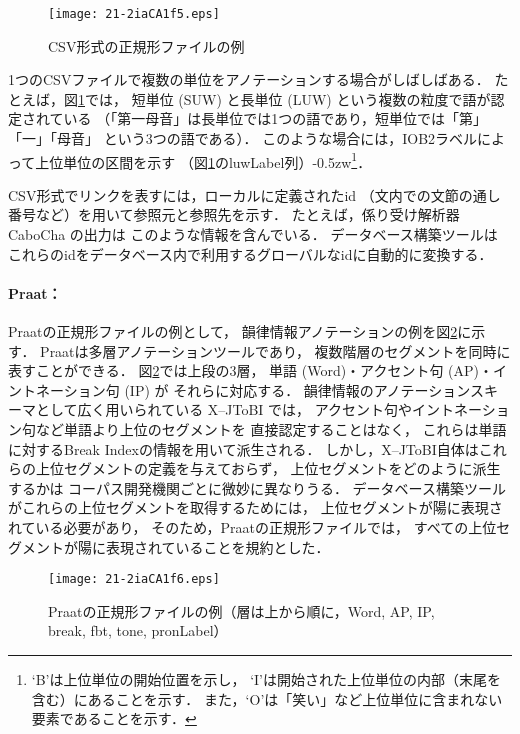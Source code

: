 \documentclass[japanese]{jnlp_1.4}
\begin{document}
\begin{figure}[t]
\begin{center}
\texttt{[image: 21-2iaCA1f5.eps]}
\end{center}
\caption{CSV形式の正規形ファイルの例}
\label{fig:CSV}
\end{figure}

1つのCSVファイルで複数の単位をアノテーションする場合がしばしばある．
たとえば，図\ref{fig:CSV}では，
短単位 (SUW) と長単位 (LUW) という複数の粒度で語が認定されている
（「第一母音」は長単位では1つの語であり，短単位では「第」「一」「母音」
という3つの語である）．
このような場合には，IOB2ラベル\cite{TjongKimSang_1999_RTC}によって上位単位の区間を示す
（図\ref{fig:CSV}のluwLabel列）{\kern-0.5zw}\footnote{
 `B'は上位単位の開始位置を示し，
`I'は開始された上位単位の内部（末尾を含む）にあることを示す．
また，`O'は「笑い」など上位単位に含まれない要素であることを示す．
}．

CSV形式でリンクを表すには，ローカルに定義されたid
（文内での文節の通し番号など）を用いて参照元と参照先を示す．
たとえば，係り受け解析器CaboCha \cite{Kudo_2002_JDA}の出力は
このような情報を含んでいる．
データベース構築ツールは
これらのidをデータベース内で利用するグローバルなidに自動的に変換する．

\paragraph{Praat：}

Praatの正規形ファイルの例として，
韻律情報アノテーションの例を図\ref{fig:Praat}に示す．
Praatは多層アノテーションツールであり，
複数階層のセグメントを同時に表すことができる．
図\ref{fig:Praat}では上段の3層，
単語 (Word)・アクセント句 (AP)・イントネーション句 (IP) が
それらに対応する．
韻律情報のアノテーションスキーマとして広く用いられている
    X--JToBI \cite{五十嵐_2006_韻律情}では，
アクセント句やイントネーション句など単語より上位のセグメントを
直接認定することはなく，
これらは単語に対するBreak Indexの情報を用いて派生される．
しかし，X--JToBI自体はこれらの上位セグメントの定義を与えておらず，
上位セグメントをどのように派生するかは
コーパス開発機関ごとに微妙に異なりうる．
データベース構築ツールがこれらの上位セグメントを取得するためには，
上位セグメントが陽に表現されている必要があり，
そのため，Praatの正規形ファイルでは，
すべての上位セグメントが陽に表現されていることを規約とした．

\begin{figure}[t]
\begin{center}
\texttt{[image: 21-2iaCA1f6.eps]}
\end{center}
\caption{Praatの正規形ファイルの例（層は上から順に，Word, AP, IP, break, fbt, tone, pronLabel）}
\label{fig:Praat}
\end{figure}
\end{document}

